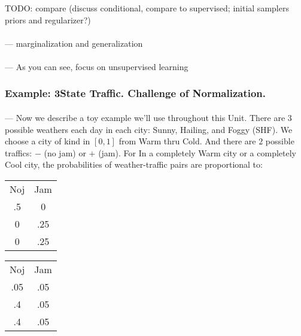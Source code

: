 \documentclass[12pt]{article}
\begin{document}
        TODO: compare (discuss conditional, compare to supervised; initial samplers priors and regularizer?)

        \paragraph{\sf} ---
        marginalization and generalization

        \paragraph{\sf} ---
        As you can see,
        focus on unsupervised learning

      \subsubsection*{Example: 3State Traffic.  Challenge of Normalization.}
        \paragraph{\sf} --- Now we describe a toy example we'll use throughout
        this Unit.  There are $3$ possible weathers each day in each city:
        Sunny, Hailing, and Foggy (SHF).  We choose a city of kind in $[0,1]$
        from Warm thru Cold.  And there are $2$ possible traffics: $-$ (no jam)
        or $+$ (jam).   For
        In a completely Warm city or a completely Cool city,
        the probabilities of weather-traffic pairs are proportional to:
        \begin{table}[h]
            \centering
            \begin{tabular}{cc}
                Noj & Jam \\%
                 .5 & 0 \\
                 0  &.25\\
                 0  &.25
            \end{tabular}
            \begin{tabular}{cc}
                Noj & Jam \\%
               .05 &.05\\
               .4  &.05\\
               .4  &.05
            \end{tabular}
        \end{table}
\end{document}
